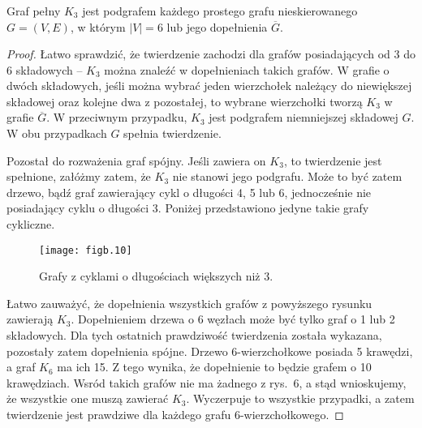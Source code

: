 \subsubsection{} %
\begin{twierdzenie*}
	Graf pełny $K_3$ jest podgrafem każdego prostego grafu nieskierowanego $G=(V,E)$, w którym $|V|=6$ lub jego dopełnienia $\overline{G}$.
\end{twierdzenie*}
\begin{proof}
Łatwo sprawdzić, że twierdzenie zachodzi dla grafów posiadających od 3 do 6 składowych -- $K_3$ można znaleźć w dopełnieniach takich grafów. W grafie o dwóch składowych, jeśli można wybrać jeden wierzchołek należący do niewiększej składowej oraz kolejne dwa z pozostałej, to wybrane wierzchołki tworzą $K_3$ w grafie $\overline{G}$. W przeciwnym przypadku, $K_3$ jest podgrafem niemniejszej składowej $G$. W obu przypadkach $G$ spełnia twierdzenie.

Pozostał do rozważenia graf spójny. Jeśli zawiera on $K_3$, to twierdzenie jest spełnione, załóżmy zatem, że $K_3$ nie stanowi jego podgrafu. Może to być zatem drzewo, bądź graf zawierający cykl o długości 4, 5 lub 6, jednocześnie nie posiadający cyklu o długości 3. Poniżej przedstawiono jedyne takie grafy cykliczne.
\begin{figure}[h]
	\begin{center}
		\texttt{[image: figb.10]}
	\end{center}
	\caption{Grafy z cyklami o długościach większych niż 3.}
\end{figure}
Łatwo zauważyć, że dopełnienia wszystkich grafów z powyższego rysunku zawierają $K_3$. Dopełnieniem drzewa o 6 węzłach może być tylko graf o 1 lub 2 składowych. Dla tych ostatnich prawdziwość twierdzenia została wykazana, pozostały zatem dopełnienia spójne. Drzewo \hbox{6-wierzchołkowe} posiada 5 krawędzi, a graf $K_6$ ma ich 15. Z tego wynika, że dopełnienie to będzie grafem o 10 krawędziach. Wsród takich grafów nie ma żadnego z rys.~6, a stąd wnioskujemy, że wszystkie one muszą zawierać $K_3$. Wyczerpuje to wszystkie przypadki, a zatem twierdzenie jest prawdziwe dla każdego grafu \hbox{6-wierzchołkowego}.

\end{proof}

